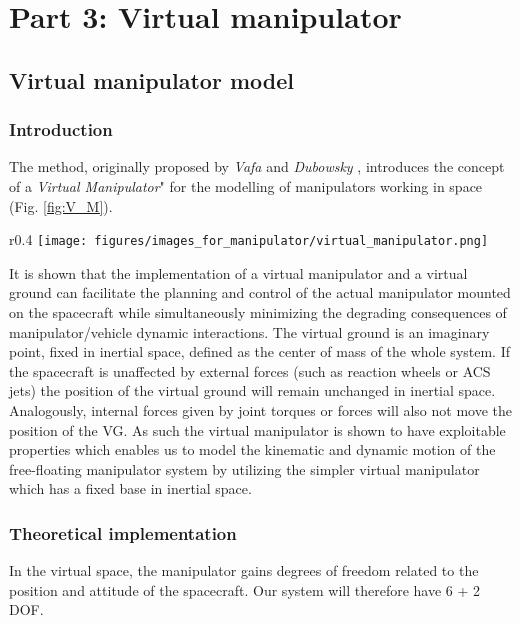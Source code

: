\documentclass[main.tex]{subfiles}
\begin{document}
\section{Part 3: Virtual manipulator}\label{sec:development}
\subsection{Virtual manipulator model}

\subsubsection{Introduction}


The method, originally proposed by \textit{Vafa} and \textit{Dubowsky} \cite{virtual_manipulator}, introduces the concept of a \textit{Virtual Manipulator}" for the modelling of manipulators working in space (Fig. \ref{fig:V_M}). 

\begin{wrapfigure}{r}{0.4\textwidth}
 \centering
\texttt{[image: figures/images\_for\_manipulator/virtual\_manipulator.png]} 
\caption{Virual manipulator}
\label{fig:V_M}
\end{wrapfigure}

It is shown that the implementation of a virtual manipulator and a virtual ground can facilitate the planning and control of the actual manipulator mounted on the spacecraft while simultaneously minimizing the degrading consequences of manipulator/vehicle dynamic interactions.
The virtual ground is an imaginary point, fixed in inertial space, defined as the center of mass of the whole system. If the spacecraft is unaffected by external forces (such as reaction wheels or ACS jets) the position of the virtual ground will remain unchanged in inertial space. Analogously, internal forces given by joint torques or forces will also not move the position of the VG. As such the virtual manipulator is shown \cite{virtual_manipulator} to have exploitable properties which enables us to model the kinematic and dynamic motion of the free-floating manipulator system by utilizing the simpler virtual manipulator which has a fixed base in inertial space.

\subsubsection{Theoretical implementation}
In the virtual space, the manipulator gains degrees of freedom related to the position and attitude of the spacecraft. Our system will therefore have 6 + 2 DOF. \\
\end{document}
